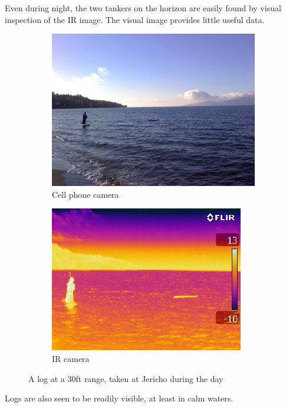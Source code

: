 Even during night, the two tankers on the horizon are easily found by visual inspection of the IR image. The visual image provides little useful data.

\begin{figure}
\centering
\begin{subfigure}{.5\textwidth}
  \centering
  \includegraphics[width=.8\linewidth]{"./image/jericho-day-log-visible"}
  \caption{Cell phone camera}
  \label{fig:sub1}
\end{subfigure}%
\begin{subfigure}{.5\textwidth}
  \centering
  \includegraphics[width=.8\linewidth]{"./image/jericho-day-log-ir"}
  \caption{IR camera}
  \label{fig:sub2}
\end{subfigure}
\caption{A log at a 30ft range, taken at Jericho during the day}
\label{fig:IR comparison of a log during the day}
\end{figure}

Logs are also seen to be readily visible, at least in calm waters.

